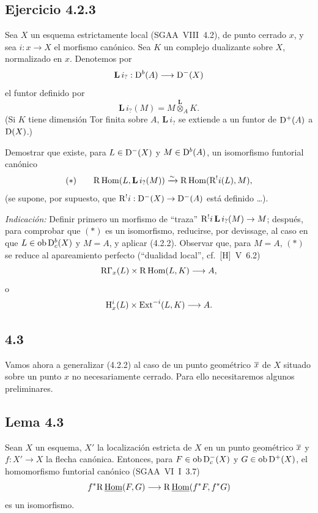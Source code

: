 \subsection*{Ejercicio 4.2.3}
Sea $X$ un esquema estrictamente local (SGAA~VIII~4.2), de punto cerrado $x$, y sea $i : x \to X$ el morfismo canónico. Sea $K$ un complejo dualizante sobre $X$, normalizado en $x$. Denotemos por
\[
\mathbf L\, i_? : \mathrm{D}^b(A)\longrightarrow \mathrm{D}^-(X)
\]
el funtor definido por
\[
\mathbf L\, i_?(M)=M\overset{\mathbf L}{\otimes}_A K.
\]
(Si $K$ tiene dimensión Tor finita sobre $A$, $\mathbf L\, i_?$ se extiende a un funtor de $\mathrm{D}^+(A)$ a $\mathrm{D}(X)$.)

Demostrar que existe, para $L \in \mathrm{D}^-(X)$ y $M \in \mathrm{D}^b(A)$, un isomorfismo funtorial canónico
\[
(*)\qquad \mathrm{R}\operatorname{Hom}(L,\mathbf L\, i_?(M))\xrightarrow{\sim}\mathrm{R}\operatorname{Hom}(\mathrm{R}^{!}i(L),M),
\]
(se supone, por supuesto, que $\mathrm{R}^{!}i : \mathrm{D}^-(X) \to \mathrm{D}^-(A)$ está definido \dots).

\emph{Indicación:} Definir primero un morfismo de ``traza'' $\mathrm{R}^{!}i\,\mathbf L\, i_?(M) \to M$; después, para comprobar que $(*)$ es un isomorfismo, reducirse, por devissage, al caso en que $L \in \operatorname{ob} \mathrm{D}_c^b(X)$ y $M = A$, y aplicar (4.2.2). Observar que, para $M = A$, $(*)$ se reduce al apareamiento perfecto (``dualidad local'', cf.~[H]~V~6.2)
\[
\mathrm{R}\Gamma_x(L)\times \mathrm{R}\operatorname{Hom}(L,K)\longrightarrow A,
\]
o
\[
\mathrm{H}_x^i(L)\times \operatorname{Ext}^{-i}(L,K)\longrightarrow A.
\]

\subsection*{4.3}
Vamos ahora a generalizar (4.2.2) al caso de un punto geométrico $\overline{x}$ de $X$ situado sobre un punto $x$ no necesariamente cerrado. Para ello necesitaremos algunos preliminares.

\subsection*{Lema 4.3}
Sean $X$ un esquema, $X'$ la localización estricta de $X$ en un punto geométrico $\overline{x}$ y $f : X' \to X$ la flecha canónica. Entonces, para $F \in \operatorname{ob} \mathrm{D}_c^-(X)$ y $G \in \operatorname{ob} \mathrm{D}^+(X)$, el homomorfismo funtorial canónico (SGAA~VI~I~3.7)
\[
f^*\mathrm{R}\,\underline{\operatorname{Hom}}(F,G)\longrightarrow \mathrm{R}\,\underline{\operatorname{Hom}}(f^*F,f^*G)
\]
es un isomorfismo.

